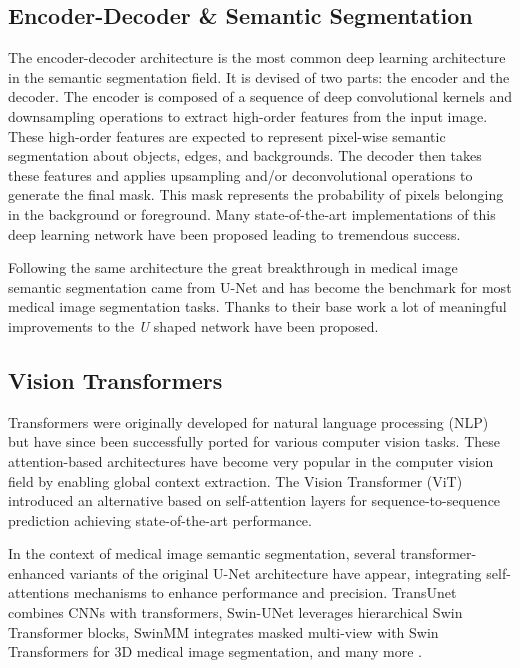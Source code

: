 \documentclass[lettersize,journal]{IEEEtran}
\begin{document}
\subsection{Encoder-Decoder \& Semantic Segmentation}
The encoder-decoder architecture is the most common deep learning architecture in the semantic segmentation field. It is devised of two parts: the encoder and the decoder. The encoder is composed of a sequence of deep convolutional kernels and downsampling operations to extract high-order features from the input image. These high-order features are expected to represent pixel-wise semantic segmentation about objects, edges, and backgrounds. The decoder then takes these features and applies upsampling and/or deconvolutional operations to generate the final mask. This mask represents the probability of pixels belonging in the background or foreground. Many state-of-the-art implementations of this deep learning network have been proposed \cite{long2015fully,he2016deep,badrinarayanan2017segnet} leading to tremendous success.   

Following the same architecture the great breakthrough in medical image semantic segmentation came from U-Net \cite{ronneberger2015u} and has become the benchmark for most medical image segmentation tasks. Thanks to their base work a lot of meaningful improvements to the \textit{U} shaped network have been proposed. 


\subsection{Vision Transformers}
Transformers were originally developed for natural language processing (NLP) but have since been successfully ported for various computer vision tasks. These attention-based architectures have become very popular in the computer vision field by enabling global context extraction. The Vision Transformer (ViT) \cite{alexey2020image} introduced an alternative based on self-attention layers for sequence-to-sequence prediction achieving state-of-the-art performance. 

In the context of medical image semantic segmentation, several transformer-enhanced variants of the original U-Net architecture have appear, integrating self-attentions mechanisms to enhance performance and precision. TransUnet \cite{chen2021transunet} combines CNNs with transformers, Swin-UNet \cite{cao2022swin} leverages hierarchical Swin Transformer blocks, SwinMM \cite{wang2023swinmm} integrates masked multi-view with Swin Transformers for 3D medical image segmentation, and many more \cite{xiao2023transformers}.
\end{document}
